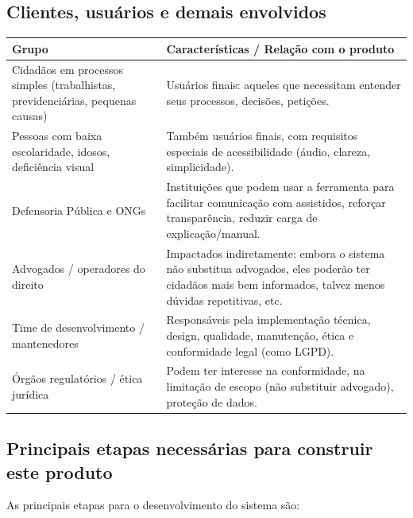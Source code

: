 \documentclass{article}
\begin{document}
\subsection{Clientes, usuários e demais envolvidos }
\begin{tabular}{|p{6cm}|p{6cm}|}
    \hline
    \centering \textbf{Grupo} & \textbf{Características / Relação com o produto}\\ \hline
    Cidadãos em processos simples (trabalhistas, previdenciárias, pequenas causas) & Usuários finais: aqueles que necessitam entender seus processos, decisões, petições. \\\hline
    Pessoas com baixa escolaridade, idosos, deficiência visual &Também usuários finais, com requisitos especiais de acessibilidade (áudio, clareza, simplicidade).\\\hline
    Defensoria Pública e ONGs &Instituições que podem usar a ferramenta para facilitar comunicação com assistidos, reforçar transparência, reduzir carga de explicação/manual. \\\hline
    Advogados / operadores do direito &Impactados indiretamente: embora o sistema não substitua advogados, eles poderão ter cidadãos mais bem informados, talvez menos dúvidas repetitivas, etc. \\\hline
    Time de desenvolvimento / mantenedores &Responsáveis pela implementação técnica, design, qualidade, manutenção, ética e conformidade legal (como LGPD). \\\hline
    Órgãos regulatórios / ética jurídica &Podem ter interesse na conformidade, na limitação de escopo (não substituir advogado), proteção de dados. \\\hline
\end{tabular}

\subsection{ Principais etapas necessárias para construir este produto}

As principais etapas para o desenvolvimento do sistema são:
\end{document}

